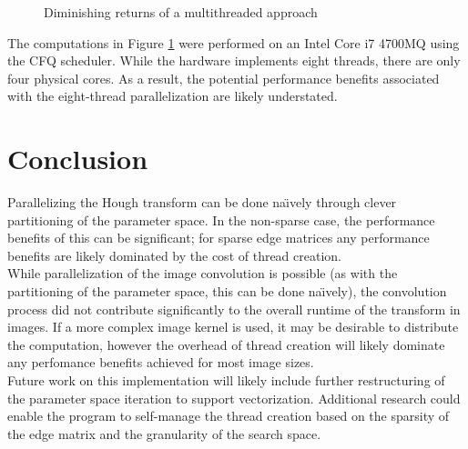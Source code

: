 \documentclass[letterpaper,12pt]{article}
\begin{document}
\begin{figure}[H]
    \caption{Diminishing returns of a multithreaded approach}
    \label{fig:graph}
\end{figure}

The computations in Figure \ref{fig:graph} were performed on an Intel Core i7 4700MQ using the CFQ scheduler.
While the hardware implements eight threads, there are only four physical cores. As a result, the potential
performance benefits associated with the eight-thread parallelization are likely understated.

\section{Conclusion}
Parallelizing the Hough transform can be done na\"{\i}vely through clever partitioning of the parameter space.
In the non-sparse case, the performance benefits of this can be significant; for sparse edge matrices any performance
benefits are likely dominated by the cost of thread creation.
\\
While parallelization of the image convolution is possible (as with the partitioning of the parameter space,
this can be done na\"{\i}vely), the convolution process did not contribute significantly to the overall
runtime of the transform in images. If a more complex image kernel is used, it may be desirable to distribute the
computation, however the overhead of thread creation will likely dominate any perfomance benefits achieved for
most image sizes.
\\
Future work on this implementation will likely include further restructuring of the parameter space iteration
to support vectorization. Additional research could enable the program to self-manage the thread creation
based on the sparsity of the edge matrix and the granularity of the search space.

\newpage

\end{document}
